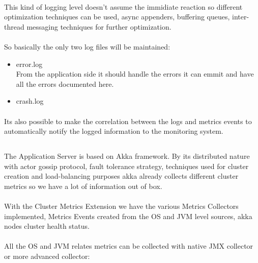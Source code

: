 \paragraph{}
This kind of logging level doesn't assume the immidiate reaction so different optimization techniques can be used, async appenders,
buffering queues, inter-thread messaging techniques for further optimization.

\paragraph{}
So basically the only two log files will be maintained:
\begin{itemize}
\item error.log \\
From the application side it should handle the errors it can emmit and have all the errors documented here.
\item crash.log
\end{itemize}

\paragraph{}
Its also possible to make the correlation between the logs and metrics events to automatically notify the logged information to the monitoring system.

\subsection*{}
\paragraph{}
The Application Server is based on Akka framework. By its distributed nature with actor gossip protocol, fault tolerance strategy, techniques used for cluster creation and load-balancing purposes akka already collects different cluster metrics so we have a lot of information out of box.

\paragraph{}
With the Cluster Metrics Extension we have the various Metrics Collectors implemented, Metrics Events created from the OS and JVM level sources, akka nodes cluster health status.

\paragraph{}
All the OS and JVM relates metrics can be collected with native JMX collector or more advanced  collector:

